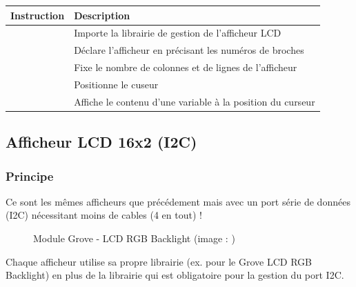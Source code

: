 \documentclass[a4paper,10pt,french]{book}
\let\sphinxpxdimen\pdfpxdimen\else\newdimen\sphinxpxdimen
\begin{document}
\begin{savenotes}\sphinxattablestart
\centering
\begin{tabulary}{\linewidth}[t]{|T|T|}
\hline
\sphinxstyletheadfamily 
Instruction
&\sphinxstyletheadfamily 
Description
\\
\hline
{}
&
Importe la librairie de gestion de l’afficheur LCD
\\
\hline
{}
&
Déclare l’afficheur en précisant les numéros de broches
\\
\hline
{}
&
Fixe le nombre de colonnes et de lignes de l’afficheur
\\
\hline
{}
&
Positionne le cuseur
\\
\hline
{}
&
Affiche le contenu d’une variable à la position du curseur
\\
\hline
\end{tabulary}
\par
\sphinxattableend\end{savenotes}


\subsection{Afficheur LCD 16x2 (I2C)}
\label{\detokenize{3_bases/4_afficheur:afficheur-lcd-16x2-i2c}}

\subsubsection{Principe}
\label{\detokenize{3_bases/4_afficheur:id1}}
Ce sont les mêmes afficheurs que précédement mais avec un port série de données (I2C) nécessitant moins de cables (4 en tout) !

\begin{figure}[H]
\centering
\capstart

\noindent\sphinxincludegraphics[width=350.00000\sphinxpxdimen,height=262.50000\sphinxpxdimen]{{04_grove_rgb_lcd}.jpg}
\caption{Module Grove - LCD RGB Backlight (image : )}\label{\detokenize{3_bases/4_afficheur:id5}}\end{figure}

Chaque afficheur utilise sa propre librairie (ex.  pour le Grove LCD RGB Backlight) en plus de la librairie  qui est obligatoire pour la gestion du port I2C.
\end{document}
